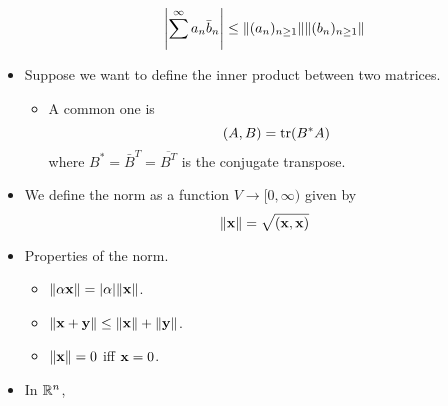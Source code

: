 \documentclass[../../notes.tex]{subfiles}
\begin{document}
\begin{itemize}
    \begin{equation*}
        \left| \sum^\infty a_n\bar{b}_n \right| \leq \norm{(a_n)_{n\geq 1}}\norm{(b_n)_{n\geq 1}}
    \end{equation*}
    \item Suppose we want to define the inner product between two matrices.
    \begin{itemize}
        \item A common one is
        \begin{equation*}
            (A,B) = \trace(B^*A)
        \end{equation*}
        where $B^*=\bar{B}^T=\overline{B^T}$ is the conjugate transpose.
    \end{itemize}
    \item We define the norm as a function $V\to[0,\infty)$ given by
    \begin{equation*}
        \norm{\mathbf{x}} = \sqrt{(\mathbf{x},\mathbf{x})}
    \end{equation*}
    \item Properties of the norm.
    \begin{itemize}
        \item $\norm{\alpha\mathbf{x}}=|\alpha|\norm{\mathbf{x}}$.
        \item $\norm{\mathbf{x}+\mathbf{y}}\leq\norm{\mathbf{x}}+\norm{\mathbf{y}}$.
        \item $\norm{\mathbf{x}}=0$ iff $\mathbf{x}=0$.
    \end{itemize}
    \item In $\mathbb{R}^n$,
    \begin{figure}[h!]
        \centering
\end{figure}
\end{itemize}
\end{document}
